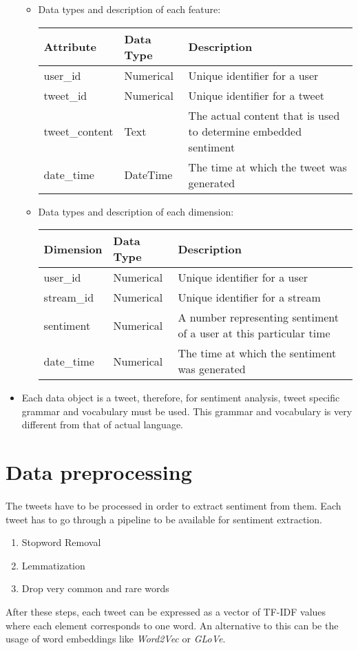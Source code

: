 \documentclass[11pt]{article}
\begin{document}
\begin{itemize}
	\begin{itemize}
		\item Data types and description of each feature:\\
		\begin{tabular}[ht]{|l|l|l|}
			\hline
			\textbf{Attribute} & \textbf{Data Type} & \textbf{Description}\\
			\hline
			user\_id & Numerical & Unique identifier for a user\\
			tweet\_id & Numerical & Unique identifier for a tweet\\
			tweet\_content & Text & The actual content that is used to determine embedded sentiment\\
			date\_time & DateTime & The time at which the tweet was generated\\
			\hline
		\end{tabular}
		\item Data types and description of each dimension:\\
		\begin{tabular}[ht]{|l|l|l|}
			\hline
			\textbf{Dimension} & \textbf{Data Type} & \textbf{Description}\\
			\hline
			user\_id & Numerical & Unique identifier for a user\\
			stream\_id & Numerical & Unique identifier for a stream\\
			sentiment & Numerical & A number representing sentiment of a user at this particular time\\
			date\_time & Numerical & The time at which the sentiment was generated\\
			\hline
		\end{tabular}
	\end{itemize}
	\item Each data object is a tweet, therefore, for sentiment analysis, tweet specific grammar and vocabulary must be used. This grammar and vocabulary is very different from that of actual language.
\end{itemize}

\section{Data preprocessing}
\paragraph{}
The tweets have to be processed in order to extract sentiment from them. Each tweet has to go through a pipeline to be available for sentiment extraction.
\begin{enumerate}[1.]
	\item Stopword Removal
	\item Lemmatization
	\item Drop very common and rare words
\end{enumerate}
After these steps, each tweet can be expressed as a vector of TF-IDF values where each element corresponds to one word. An alternative to this can be the usage of word embeddings like \textit{Word2Vec} or \textit{GLoVe}.
\end{document}
